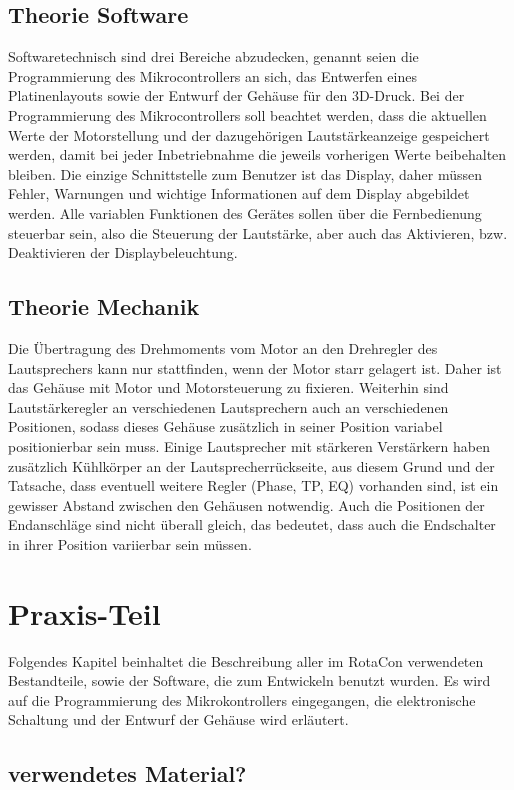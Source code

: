 \documentclass[11pt, titlepage, fleqn]{report}
\begin{document}
		\section{Theorie Software}
		\label{sec:Theorie Software}
			Softwaretechnisch sind drei Bereiche abzudecken, genannt seien die Programmierung des Mikrocontrollers an sich, das Entwerfen eines Platinenlayouts 
			sowie der Entwurf der Gehäuse für den 3D-Druck.
			Bei der Programmierung des Mikrocontrollers soll beachtet werden, dass die aktuellen Werte der Motorstellung und der dazugehörigen Lautstärkeanzeige
			gespeichert werden, damit bei jeder Inbetriebnahme die jeweils vorherigen Werte beibehalten bleiben. Die einzige Schnittstelle zum 
			Benutzer ist das Display, daher müssen Fehler, Warnungen und wichtige Informationen auf dem Display abgebildet werden. Alle variablen Funktionen des Gerätes 
			sollen über die Fernbedienung steuerbar sein, also die Steuerung der Lautstärke, aber auch das Aktivieren, bzw. Deaktivieren der Displaybeleuchtung.
		\section{Theorie Mechanik}
			Die Übertragung des Drehmoments vom Motor an den Drehregler des Lautsprechers kann nur stattfinden, wenn der Motor starr gelagert ist. Daher ist das Gehäuse 
			mit Motor und Motorsteuerung zu fixieren. Weiterhin sind Lautstärkeregler an verschiedenen Lautsprechern auch an verschiedenen Positionen, sodass dieses Gehäuse 
			zusätzlich in seiner Position variabel positionierbar sein muss. Einige Lautsprecher mit stärkeren Verstärkern haben zusätzlich Kühlkörper an der Lautsprecherrückseite, 
			aus diesem Grund und der Tatsache, dass eventuell weitere Regler (Phase, TP, EQ) vorhanden sind, ist ein gewisser Abstand zwischen den Gehäusen notwendig.
			Auch die Positionen der Endanschläge sind nicht überall gleich, das bedeutet, dass auch die Endschalter in ihrer Position variierbar sein müssen.
		\label{sec:Theorie Mecanik}
	\chapter{Praxis-Teil}
	\label{sec:Praxistil}
		Folgendes Kapitel beinhaltet die Beschreibung aller im RotaCon verwendeten Bestandteile, sowie der Software, die zum Entwickeln benutzt wurden.
		Es wird auf die Programmierung des Mikrokontrollers eingegangen, die elektronische Schaltung und der Entwurf der Gehäuse wird erläutert.
		\section{verwendetes Material?}
\end{document}

